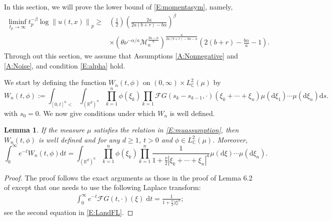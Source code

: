 \documentclass[a4paper,11pt]{article}
\numberwithin{equation}{section}
\numberwithin{equation}{section}
\theoremstyle{plain}
\newtheorem{lemma}[theorem]{Lemma}
\theoremstyle{definition}
\newcommand{\ud}{\ensuremath{\mathrm{d} }}
\newcommand{\Norm}[1]{\left\|  #1   \right\|}
\newcommand{\R}{\mathbb{R}}
\begin{document}
In this section, we will prove the lower bound of \eqref{E:momentasym}, namely,
\begin{equation} \label{E:momentasym-lower}
  \begin{aligned}
    \liminf_{t_p \to \infty} t_p^{-\beta} \log \Norm{u(t,x)}_p \ge
    & \left(\frac{1}{2}\right)\left(\frac{2a}{2a(b+r)- b\alpha} \right)^\beta \\
    & \times \left(\theta\nu^{-\alpha/a} \mathcal{M}_a^{\frac{2a-\alpha}{a}}\right)^{\frac{a}{2a(b+r)-b\alpha-a}}\left(2(b+r)-\frac{b\alpha}{a}-1\right).
  \end{aligned}
\end{equation}
Through out this section, we assume that Assumptions \ref{A:Nonnegative} and \ref{A:Noise}, and
condition \eqref{E:alpha} hold.

We start by defining the function $W_n(t,\phi)$ on $(0,\infty) \times L_{\mathbb{C}}^2(\mu)$ by
\begin{equation}
  W_n(t,\phi) := \int_{[0,t]^n<}
  \int_{(\R^d)^n} \prod_{k=1}^n \phi(\xi_k) \prod_{k=1}\mathcal{F}G(s_k-s_{k-1},\cdot)(\xi_k + \cdots + \xi_n) \mu(\ud \xi_1)\cdots \mu(\ud \xi_n) \ud s.
\end{equation}
with $s_0=0$. We now give conditions under which $W_n$ is well defined.

\begin{lemma} \label{L:LWn}
  If the measure $\mu$ satisfies the relation in \eqref{E:muassumption}, then $W_n(t,\phi)$ is well
  defined and for any $d \ge 1$, $t>0$ and $\phi \in L^2_{\mathbb{C}}(\mu)$. Moreover,
  \begin{equation}
    \label{E:LWn}
    \int_0^\infty e^{-t}W_n(t,\phi) \ud t
    = \int_{(\R^d)^n} \prod_{k=1}^n \phi(\xi_k) \prod_{k=1}^n \frac{1}{1+\frac{\nu}{2}|\xi_k + \cdots + \xi_n|^a} \mu(\ud \xi) \cdots \mu(\ud \xi_n).
  \end{equation}
\end{lemma}
\begin{proof}
  The proof follows the exact arguments as those in the proof of Lemma 6.2 of \cite{BCC21} except
  that one needs to use the following Laplace transform:
  \begin{align*}
    \int_0^\infty e^{-t} \mathcal{F}G(t,\cdot)(\xi) \; \ud t =\frac{1}{1+\frac{\nu}{2}|\xi|^a};
  \end{align*}
  see the second equation in \eqref{E:LandFL}.
\end{proof}
\end{document}
